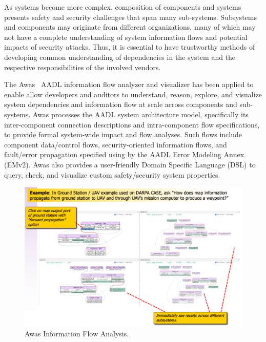 
As systems become more complex, composition of components and 
systems presents safety and security challenges that span
many sub-systems.  Subsystems and components may originate from
different organizations, many of which may not have a complete
understanding of system information flows and potential impacts of
security attacks.  Thus, it is essential to have trustworthy methods
of developing common understanding of dependencies in the system and
the respective responsibilities of the involved vendors.  

The Awas~\cite{awas} AADL information flow analyzer and visualizer has been 
applied to enable allow developers and auditors to understand, reason,
explore, and visualize system dependencies and information flow at
scale across components and sub-systems.  Awas processes the AADL
system architecture model, specifically its inter-component connection
descriptions and intra-component flow specifications, to provide
formal system-wide impact and flow analyses.
Such flows include component data/control flows,
security-oriented information flows, and fault/error propagation
specified using by the AADL Error Modeling Annex (EMv2).
Awas also provides a user-friendly Domain Specific Language (DSL) to 
query, check, and visualize custom safety/security system properties.

\begin{figure}
	\centering
	\includegraphics[width=\textwidth]{figs/CASE-Awas.png}
	\caption{Awas Information Flow Analysis.} 
	\label{fig:CASE-Awas} 
\end{figure}

